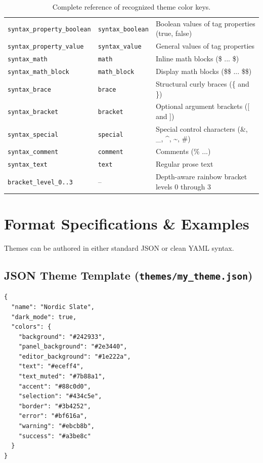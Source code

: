 \documentclass[11pt, a4paper]{article}
\begin{document}
\begin{table}[htbp]
\begin{tabular}{lll}
\texttt{syntax\_property\_boolean} & \texttt{syntax\_boolean} & Boolean values of tag properties (true, false) \\
\texttt{syntax\_property\_value} & \texttt{syntax\_value} & General values of tag properties \\
\texttt{syntax\_math} & \texttt{math} & Inline math blocks (\$ ... \$) \\
\texttt{syntax\_math\_block} & \texttt{math\_block} & Display math blocks (\$\$ ... \$\$) \\
\texttt{syntax\_brace} & \texttt{brace} & Structural curly braces (\{ and \}) \\
\texttt{syntax\_bracket} & \texttt{bracket} & Optional argument brackets ([ and ]) \\
\texttt{syntax\_special} & \texttt{special} & Special control characters (\&, \_, \^{}, \textasciitilde, \#) \\
\texttt{syntax\_comment} & \texttt{comment} & Comments (\% ...) \\
\texttt{syntax\_text} & \texttt{text} & Regular prose text \\
\texttt{bracket\_level\_0..3} & -- & Depth-aware rainbow bracket levels 0 through 3 \\
\bottomrule
\end{tabular}
\caption{Complete reference of recognized theme color keys.}
\label{tab:theme_keys}
\end{table}

\section{Format Specifications \& Examples}

Themes can be authored in either standard JSON or clean YAML syntax.

\subsection{JSON Theme Template (\texttt{themes/my\_theme.json})}
\begin{verbatim}
{
  "name": "Nordic Slate",
  "dark_mode": true,
  "colors": {
    "background": "#242933",
    "panel_background": "#2e3440",
    "editor_background": "#1e222a",
    "text": "#eceff4",
    "text_muted": "#7b88a1",
    "accent": "#88c0d0",
    "selection": "#434c5e",
    "border": "#3b4252",
    "error": "#bf616a",
    "warning": "#ebcb8b",
    "success": "#a3be8c"
  }
}
\end{verbatim}
\end{document}

